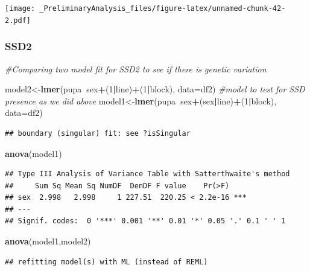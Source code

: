 \documentclass[
]{article}
\newenvironment{Shaded}{\begin{snugshade}}{\end{snugshade}}
\newcommand{\CommentTok}[1]{\textcolor[rgb]{0.56,0.35,0.01}{\textit{#1}}}
\newcommand{\DataTypeTok}[1]{\textcolor[rgb]{0.13,0.29,0.53}{#1}}
\newcommand{\DecValTok}[1]{\textcolor[rgb]{0.00,0.00,0.81}{#1}}
\newcommand{\KeywordTok}[1]{\textcolor[rgb]{0.13,0.29,0.53}{\textbf{#1}}}
\newcommand{\NormalTok}[1]{#1}
\newcommand{\OperatorTok}[1]{\textcolor[rgb]{0.81,0.36,0.00}{\textbf{#1}}}
\begin{document}
\texttt{[image: \_PreliminaryAnalysis\_files/figure-latex/unnamed-chunk-42-2.pdf]}

\hypertarget{ssd2}{%
\subsubsection{SSD2}\label{ssd2}}

\begin{Shaded}
\begin{Highlighting}[]
\CommentTok{#Comparing two model fit for SSD2 to see if there is genetic variation}

\NormalTok{model2<-}\KeywordTok{lmer}\NormalTok{(pupa}\OperatorTok{~}\NormalTok{sex}\OperatorTok{+}\NormalTok{(}\DecValTok{1}\OperatorTok{|}\NormalTok{line)}\OperatorTok{+}\NormalTok{(}\DecValTok{1}\OperatorTok{|}\NormalTok{block), }\DataTypeTok{data=}\NormalTok{df2)  }\CommentTok{#model to test for SSD presence as we did above}
\NormalTok{model1<-}\KeywordTok{lmer}\NormalTok{(pupa}\OperatorTok{~}\NormalTok{sex}\OperatorTok{+}\NormalTok{(sex}\OperatorTok{|}\NormalTok{line)}\OperatorTok{+}\NormalTok{(}\DecValTok{1}\OperatorTok{|}\NormalTok{block), }\DataTypeTok{data=}\NormalTok{df2) }
\end{Highlighting}
\end{Shaded}

\begin{verbatim}
## boundary (singular) fit: see ?isSingular
\end{verbatim}

\begin{Shaded}
\begin{Highlighting}[]
\KeywordTok{anova}\NormalTok{(model1)}
\end{Highlighting}
\end{Shaded}

\begin{verbatim}
## Type III Analysis of Variance Table with Satterthwaite's method
##     Sum Sq Mean Sq NumDF  DenDF F value    Pr(>F)    
## sex  2.998   2.998     1 227.51  220.25 < 2.2e-16 ***
## ---
## Signif. codes:  0 '***' 0.001 '**' 0.01 '*' 0.05 '.' 0.1 ' ' 1
\end{verbatim}

\begin{Shaded}
\begin{Highlighting}[]
\KeywordTok{anova}\NormalTok{(model1,model2)}
\end{Highlighting}
\end{Shaded}

\begin{verbatim}
## refitting model(s) with ML (instead of REML)
\end{verbatim}
\end{document}

